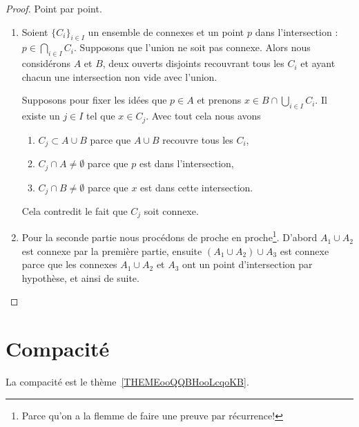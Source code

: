 \begin{proof}
	Point par point.
	\begin{enumerate}
		\item
		      Soient \( \{ C_i \}_{i\in I}\) un ensemble de connexes et un point \( p\) dans l'intersection : \( p\in\bigcap_{i\in I}C_i\). Supposons que l'union ne soit pas connexe. Alors nous considérons \( A\) et \( B\), deux ouverts disjoints recouvrant tous les \( C_i\) et ayant chacun une intersection non vide avec l'union.

		      Supposons pour fixer les idées que \( p\in A\) et prenons \( x\in B\cap\bigcup_{i\in I}C_i\). Il existe un \( j\in I\) tel que \( x\in C_j\). Avec tout cela nous avons
		      \begin{enumerate}
			      \item
			            \( C_j\subset A\cup B\) parce que \(A \cup B\) recouvre tous les \( C_i \),
			      \item
			            \( C_j\cap A\neq \emptyset\) parce que \( p\) est dans l'intersection,
			      \item
			            \( C_j\cap B\neq\emptyset\) parce que \( x\) est dans cette intersection.
		      \end{enumerate}
		      Cela contredit le fait que \( C_j\) soit connexe.

		\item

		      Pour la seconde partie nous procédons de proche en proche\footnote{Parce qu'on a la flemme de faire une preuve par récurrence!}. D'abord \( A_1\cup A_2\) est connexe par la première partie, ensuite \( (A_1\cup A_2)\cup A_3\) est connexe parce que les connexes \( A_1\cup A_2\) et \( A_3\) ont un point d'intersection par hypothèse, et ainsi de suite.
	\end{enumerate}
\end{proof}


\section{Compacité}

La compacité est le thème~\ref{THEMEooQQBHooLcqoKB}.

